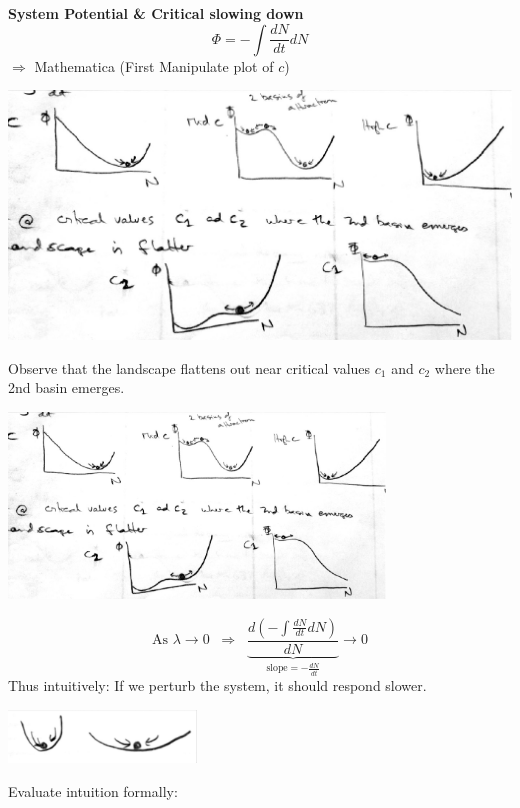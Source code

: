 \documentclass{article}
\newcommand{\note}[1]{\colorbox{gray!30}{#1}}
\newcommand{\ind}{\-\hspace{1cm}}
\begin{document}
\textbf{System Potential \& Critical slowing down}\\
\begin{equation*}
\Phi=-\int \frac{dN}{dt}dN
\end{equation*}
\ind \note{$\Rightarrow$ Mathematica (First Manipulate plot of $c$)}\\
\begin{center}
 	\includegraphics[width=15cm]{figs/Exploitation_SysPot.pdf}
\end{center}
Observe that the landscape flattens out near critical values $c_1$ and $c_2$ where the 2nd basin emerges.
\begin{center}
 	\includegraphics[width=10cm]{figs/Exploitation_SysPot_c.pdf}
\end{center}
\begin{equation*}
\text{As }\lambda \to 0 \; \;  \Rightarrow \;\; \underbrace{\frac{d (- \int \frac{dN}{dt}dN)}{dN}}_{\text{slope} =-\frac{dN}{dt}} \to 0
\end{equation*}
Thus intuitively:  If we perturb the system, it should respond slower.
\begin{center}
 	\includegraphics[width=5cm]{figs/BallCup.pdf}
\end{center}
\pagebreak
Evaluate intuition formally:
\end{document}
